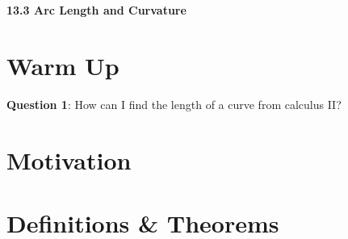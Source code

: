 \documentclass[11pt]{article}
\newcommand{\vs}{\vspace*{.1in}}
\begin{document}
\begin{LARGE}\begin{center}\bf 13.3 Arc Length and Curvature\end{center}
\end{LARGE}

\vs\vs



\section{Warm Up}

\textbf{Question 1}: How can I find the length of a curve from calculus II?


\section{Motivation}




\section{Definitions \& Theorems}
\end{document}
